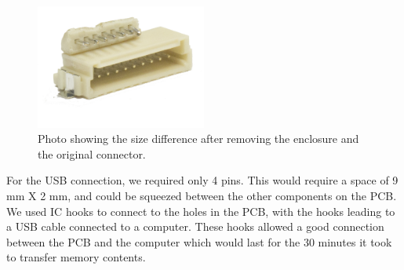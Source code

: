 \begin{figure}
\begin{center}
\includegraphics[width=0.5\textwidth]{images/ConnectorBoth.JPG}
\caption{Photo showing the size difference after removing the enclosure and the original connector.}
\label{Fig:ConnectorBoth}
\end{center}
\end{figure}
For the USB connection, we required only 4 pins.
This would require a space of 9 mm X 2 mm,
and could be squeezed between the other components on the PCB.
We used IC hooks to connect to the holes in the PCB,
with the hooks leading to a USB cable connected to a computer.
These hooks allowed a good connection between the PCB and the computer which would last for the 30 minutes it took to transfer memory contents.
